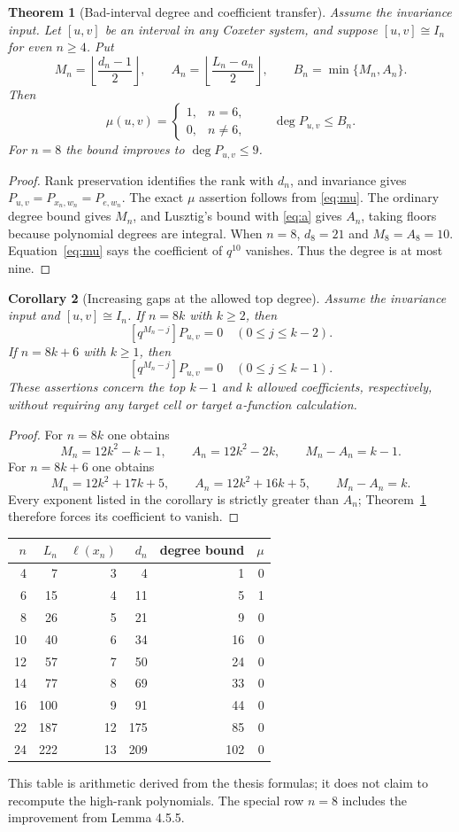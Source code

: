 \documentclass[11pt]{article}
\newtheorem{theorem}{Theorem}[section]
\newtheorem{corollary}[theorem]{Corollary}
\theoremstyle{definition}\newtheorem{definition}[theorem]{Definition}
\theoremstyle{remark}\newtheorem{remark}[theorem]{Remark}
\begin{document}
\begin{theorem}[Bad-interval degree and coefficient transfer]\label{thm:bad}
Assume the invariance input. Let $[u,v]$ be an interval in any Coxeter
system, and suppose $[u,v]\cong I_n$ for even $n\geq4$. Put
\[
 M_n=\left\lfloor\frac{d_n-1}{2}\right\rfloor,
 \qquad A_n=\left\lfloor\frac{L_n-a_n}{2}\right\rfloor,
 \qquad B_n=\min\{M_n,A_n\}.
\]
Then
\[
 \mu(u,v)=\begin{cases}1,&n=6,\\0,&n\ne6,\end{cases}
 \qquad \deg P_{u,v}\leq B_n.
\]
For $n=8$ the bound improves to $\deg P_{u,v}\leq9$.
\end{theorem}
\begin{proof}
Rank preservation identifies the rank with $d_n$, and invariance gives
$P_{u,v}=P_{x_n,w_n}=P_{e,w_n}$. The exact $\mu$ assertion follows from
\eqref{eq:mu}. The ordinary degree bound gives $M_n$, and Lusztig's
bound with \eqref{eq:a} gives $A_n$, taking floors because polynomial
degrees are integral. When $n=8$, $d_8=21$ and $M_8=A_8=10$.
Equation~\eqref{eq:mu} says the coefficient of $q^{10}$ vanishes.
Thus the degree is at most nine.
\end{proof}

\begin{corollary}[Increasing gaps at the allowed top degree]\label{cor:gaps}
Assume the invariance input and $[u,v]\cong I_n$.
If $n=8k$ with $k\geq2$, then
\[
 [q^{M_n-j}]P_{u,v}=0\quad(0\leq j\leq k-2).
\]
If $n=8k+6$ with $k\geq1$, then
\[
 [q^{M_n-j}]P_{u,v}=0\quad(0\leq j\leq k-1).
\]
These assertions concern the top $k-1$ and $k$ \emph{allowed}
coefficients, respectively, without requiring any target cell or
target $a$-function calculation.
\end{corollary}
\begin{proof}
For $n=8k$ one obtains
\[
 M_n=12k^2-k-1,\qquad A_n=12k^2-2k,
 \qquad M_n-A_n=k-1.
\]
For $n=8k+6$ one obtains
\[
 M_n=12k^2+17k+5,\qquad A_n=12k^2+16k+5,
 \qquad M_n-A_n=k.
\]
Every exponent listed in the corollary is strictly greater than $A_n$;
Theorem~\ref{thm:bad} therefore forces its coefficient to vanish.
\end{proof}

\begin{center}
\begin{tabular}{rrrrrr}
\toprule
$n$&$L_n$&$\ell(x_n)$&$d_n$&degree bound&$\mu$\\
\midrule
4&7&3&4&1&0\\
6&15&4&11&5&1\\
8&26&5&21&9&0\\
10&40&6&34&16&0\\
12&57&7&50&24&0\\
14&77&8&69&33&0\\
16&100&9&91&44&0\\
22&187&12&175&85&0\\
24&222&13&209&102&0\\
\bottomrule
\end{tabular}
\end{center}
This table is arithmetic derived from the thesis formulas; it does not
claim to recompute the high-rank polynomials. The special row $n=8$
includes the improvement from Lemma 4.5.5.
\end{document}
